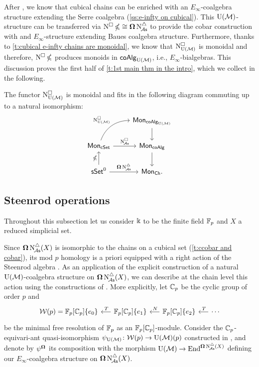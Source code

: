 After \cite{medina2022cube_einfty}, we know that cubical chains can be enriched with an $E_\infty$-coalgebra structure extending the Serre coalgebra (\cref{ss:e-infty on cubical}).
This ${\operatorname{U}(\mathcal{M})}$-structure can be transferred via $\operatorname{N^{\square}} \operatorname{\mathbb{\Omega}} \cong \operatorname{\mathbf{\Omega}} \operatorname{N^{\triangle}_{\!{\mathcal{A}\mathsf{s}}}}$ to provide the cobar construction with and $E_\infty$-structure extending Baues coalgebra structure.
Furthermore, thanks to \cref{t:cubical e-infty chains are monoidal}, we know that $\operatorname{N^{\square}_{{\operatorname{U}(\mathcal{M})}}}$ is monoidal and therefore, $\operatorname{N^{\square}} \operatorname{\mathbb{\Omega}}$ produces monoids in $\mathsf{coAlg}_{{\operatorname{U}(\mathcal{M})}}$, i.e., $E_\infty$-bialgebras.
This discussion proves the first half of \cref{t:1st main thm in the intro}, which we collect in the following.

\begin{lemma}\label{l:lift of cobar to e-infty}
	The functor $\operatorname{N^{\square}_{{\operatorname{U}(\mathcal{M})}}}$ is monoidal and fits in the following diagram commuting up to a natural isomorphism:
	\[
	\begin{tikzcd}
		& \Mon_{\coAlg_\UM} \arrow[d] \\
		\Mon_{\cSet} \arrow[ru, "\cchainsUM", out=70, in=180] \arrow[r, "\cchainsA"]
		& \Mon_{\coAlg} \arrow[d] \\
		\sSet^0 \arrow[r, "\cobar \schainsA"] \arrow[u, "\ccobar"]
		& \Mon_{\Ch}.
	\end{tikzcd}
	\]
\end{lemma}

\subsection{Steenrod operations}

Throughout this subsection let us consider $\Bbbk$ to be the finite field ${\mathbb{F}_p}$ and $X$ a reduced simplicial set.

Since $\operatorname{\mathbf{\Omega}} \operatorname{N^{\triangle}_{\!{\mathcal{A}\mathsf{s}}}}(X)$ is isomorphic to the chains on a cubical set (\cref{t:ccobar and cobar}), its mod $p$ homology is a priori equipped with a right action of the Steenrod algebra \cite{steenrod1962cohomology, milnor1958steenrod}.
As an application of the explicit construction of a natural ${\operatorname{U}(\mathcal{M})}$-coalgebra structure on $\operatorname{\mathbf{\Omega}} \operatorname{N^{\triangle}_{\!{\mathcal{A}\mathsf{s}}}}(X)$, we can describe at the chain level this action using the constructions of \cite{medina2021may_st}.
More explicitly, let ${\mathbb{C}_p}$ be the cyclic group of order $p$ and
\[
\begin{tikzcd} [column sep = .5cm]
	\cW(p) = \Fp[\Cp]\{e_0\} & \arrow[l, "\,T"'] \Fp[\Cp]\{e_1\} & \arrow[l, "\,N"'] \Fp[\Cp]\{e_2\} & \arrow[l, "\,T"'] \dotsb
\end{tikzcd}
\]
be the minimal free resolution of ${\mathbb{F}_p}$ as an ${\mathbb{F}_p}[{\mathbb{C}_p}]$-module.
Consider the ${\mathbb{C}_p}$-equivari-ant quasi-isomorphism $\psi_{\operatorname{U}(\mathcal{M})} \colon \mathcal{W}(p) \to {\operatorname{U}(\mathcal{M})}(p)$ constructed in \cite{medina2021may_st}, and denote by $\psi^{\operatorname{\mathbf{\Omega}}}$ its composition with the morphism ${\operatorname{U}(\mathcal{M})} \to \mathrm{End}^{\operatorname{\mathbf{\Omega}} \operatorname{N^{\triangle}_{\!{\mathcal{A}\mathsf{s}}}}(X)}$ defining our $E_\infty$-coalgebra structure on $\operatorname{\mathbf{\Omega}} \operatorname{N^{\triangle}_{\!{\mathcal{A}\mathsf{s}}}}(X)$.

